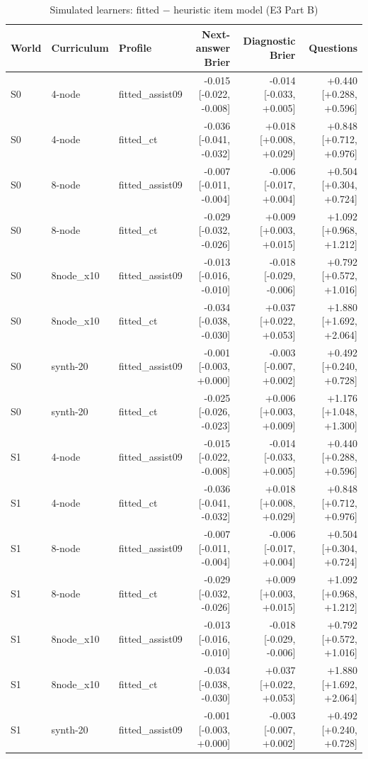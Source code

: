 \begin{table}[htbp]
\centering\small
\caption{Simulated learners: fitted $-$ heuristic item model (E3 Part B)}
\label{tab:t6}
\begin{tabular}{lllrrr}
\toprule
World & Curriculum & Profile & Next-answer Brier & Diagnostic Brier & Questions \\
\midrule
S0 & 4-node & fitted\_assist09 & -0.015 [-0.022, -0.008] & -0.014 [-0.033, +0.005] & +0.440 [+0.288, +0.596] \\
S0 & 4-node & fitted\_ct & -0.036 [-0.041, -0.032] & +0.018 [+0.008, +0.029] & +0.848 [+0.712, +0.976] \\
S0 & 8-node & fitted\_assist09 & -0.007 [-0.011, -0.004] & -0.006 [-0.017, +0.004] & +0.504 [+0.304, +0.724] \\
S0 & 8-node & fitted\_ct & -0.029 [-0.032, -0.026] & +0.009 [+0.003, +0.015] & +1.092 [+0.968, +1.212] \\
S0 & 8node\_x10 & fitted\_assist09 & -0.013 [-0.016, -0.010] & -0.018 [-0.029, -0.006] & +0.792 [+0.572, +1.016] \\
S0 & 8node\_x10 & fitted\_ct & -0.034 [-0.038, -0.030] & +0.037 [+0.022, +0.053] & +1.880 [+1.692, +2.064] \\
S0 & synth-20 & fitted\_assist09 & -0.001 [-0.003, +0.000] & -0.003 [-0.007, +0.002] & +0.492 [+0.240, +0.728] \\
S0 & synth-20 & fitted\_ct & -0.025 [-0.026, -0.023] & +0.006 [+0.003, +0.009] & +1.176 [+1.048, +1.300] \\
S1 & 4-node & fitted\_assist09 & -0.015 [-0.022, -0.008] & -0.014 [-0.033, +0.005] & +0.440 [+0.288, +0.596] \\
S1 & 4-node & fitted\_ct & -0.036 [-0.041, -0.032] & +0.018 [+0.008, +0.029] & +0.848 [+0.712, +0.976] \\
S1 & 8-node & fitted\_assist09 & -0.007 [-0.011, -0.004] & -0.006 [-0.017, +0.004] & +0.504 [+0.304, +0.724] \\
S1 & 8-node & fitted\_ct & -0.029 [-0.032, -0.026] & +0.009 [+0.003, +0.015] & +1.092 [+0.968, +1.212] \\
S1 & 8node\_x10 & fitted\_assist09 & -0.013 [-0.016, -0.010] & -0.018 [-0.029, -0.006] & +0.792 [+0.572, +1.016] \\
S1 & 8node\_x10 & fitted\_ct & -0.034 [-0.038, -0.030] & +0.037 [+0.022, +0.053] & +1.880 [+1.692, +2.064] \\
S1 & synth-20 & fitted\_assist09 & -0.001 [-0.003, +0.000] & -0.003 [-0.007, +0.002] & +0.492 [+0.240, +0.728] \\

\end{tabular}
\end{table}
